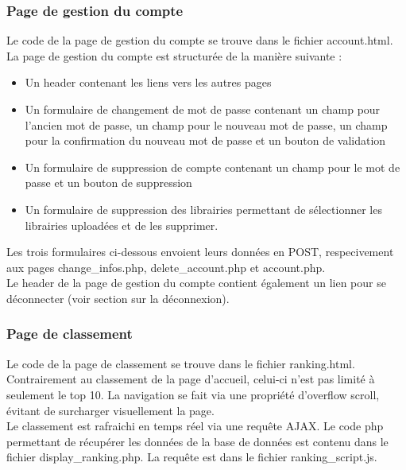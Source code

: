 \documentclass[12pt, openany]{article}
\begin{document}
	\subsubsection{Page de gestion du compte}
	Le code de la page de gestion du compte se trouve dans le fichier account.html.\\
	La page de gestion du compte est structurée de la manière suivante :
	\begin{itemize}[label=$-$]
		\item Un header contenant les liens vers les autres pages\\
		\item Un formulaire de changement de mot de passe contenant un champ pour l'ancien mot de passe, un champ pour le nouveau mot de passe, un champ pour la confirmation du nouveau mot de passe et un bouton de validation\\
		\item Un formulaire de suppression de compte contenant un champ pour le mot de passe et un bouton de suppression\\
		\item Un formulaire de suppression des librairies permettant de sélectionner les librairies uploadées et de les supprimer.\\
	\end{itemize}

	Les trois formulaires ci-dessous envoient leurs données en POST, respecivement aux pages change\_infos.php, delete\_account.php et account.php.\\
	Le header de la page de gestion du compte contient également un lien pour se déconnecter (voir section sur la déconnexion).\\
	\subsubsection{Page de classement}
	Le code de la page de classement se trouve dans le fichier ranking.html.\\
	Contrairement au classement de la page d'accueil, celui-ci n'est pas limité à seulement le top 10. La navigation se fait via une propriété d'overflow scroll, évitant de surcharger visuellement la page.\\
	Le classement est rafraichi en temps réel via une requête AJAX. Le code php permettant de récupérer les données de la base de données est contenu dans le fichier display\_ranking.php. La requête est dans le fichier ranking\_script.js.\\
\end{document}
